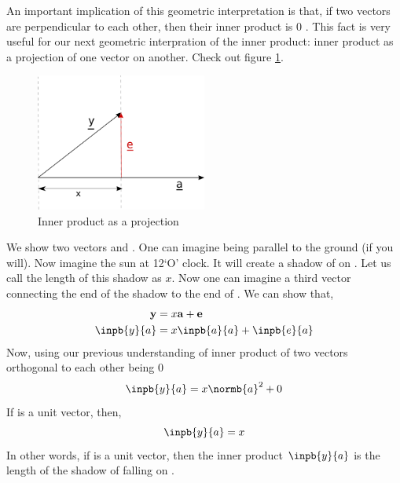An important implication of this geometric interpretation is that, if two vectors are perpendicular to each other, then their inner product is \(0\) . This fact is very useful for our next geometric interpration of the inner product: inner product as a projection of one vector on another. Check out figure \ref{fig:inner_product_projection}. 
	\begin{figure}[h!]
	\centering
	\includegraphics[width=0.5\textwidth]{Linear_Algebra/inner_product_projection}
	\caption{Inner product as a projection}
	\label{fig:inner_product_projection}
	\end{figure}
We show two vectors  and . One can imagine  being parallel to the ground (if you will). Now imagine the sun at 12`O' clock. It will create a shadow of  on . Let us call the length of this shadow as \(x\). Now one can imagine a third vector  connecting the end of the shadow to the end of . We can show that,
	\begin{align*}
	\mathbf{y} &= x\mathbf{a} + \mathbf{e} \\
	\inpb{y}{a} &= x\inpb{a}{a} + \inpb{e}{a}
	\end{align*}
	Now, using our previous understanding of inner product of two vectors orthogonal to each other being \(0\)
	\[ \inpb{y}{a} = x\normb{a}^2 + 0 \]
	If  is a unit vector, then,
	\[ \inpb{y}{a} = x \] 
In other words, if  is a unit vector, then the inner product \( \inpb{y}{a} \) is the length of the shadow of  falling on .
	
